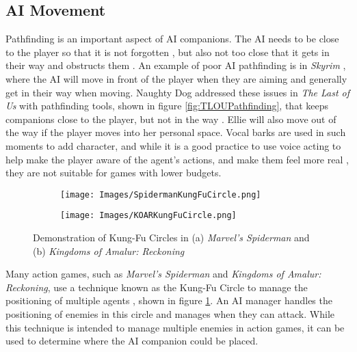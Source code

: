 \documentclass{IEEEtran}
\begin{document}
\subsection{AI Movement}
\label{Movement}

Pathfinding is an important aspect of AI companions. The AI needs to be close to the player so that it is not forgotten \cite{GAIP2EllieAI}, but also not too close that it gets in their way and obstructs them \cite{CoupledEmpowermentMaximisation}. An example of poor AI pathfinding is in \textit{Skyrim} \cite{tremblay2013adaptive}, where the AI will move in front of the player when they are aiming and generally get in their way when moving. Naughty Dog addressed these issues in \textit{The Last of Us} with pathfinding tools, shown in figure \ref{fig:TLOUPathfinding}, that keeps companions close to the player, but not in the way \cite{GAIP2EllieAI}. Ellie will also move out of the way if the player moves into her personal space. Vocal barks are used in such moments to add character, and while it is a good practice to use voice acting to help make the player aware of the agent’s actions, and make them feel more real \cite{GMTGoodAI}, they are not suitable for games with lower budgets.

\begin{figure}
  \centering
  
  \begin{subfigure}[a]{\linewidth}
  \texttt{[image: Images/SpidermanKungFuCircle.png]}
  \end{subfigure}
  
  \begin{subfigure}[b]{\linewidth}
  \texttt{[image: Images/KOARKungFuCircle.png]}
  \end{subfigure}
  
  \caption{Demonstration of Kung-Fu Circles in (a) \textit{Marvel's Spiderman} and (b) \textit{Kingdoms of Amalur: Reckoning}}
  \label{fig:KungFuCircle}
\end{figure}

Many action games, such as \textit{Marvel's Spiderman} and \textit{Kingdoms of Amalur: Reckoning}, use a technique known as the Kung-Fu Circle to manage the positioning of multiple agents \cite{GAIPKungFuCircle, GDCSpiderman}, shown in figure \ref{fig:KungFuCircle}. An AI manager handles the positioning of enemies in this circle and manages when they can attack. While this technique is intended to manage multiple enemies in action games, it can be used to determine where the AI companion could be placed.
\end{document}
